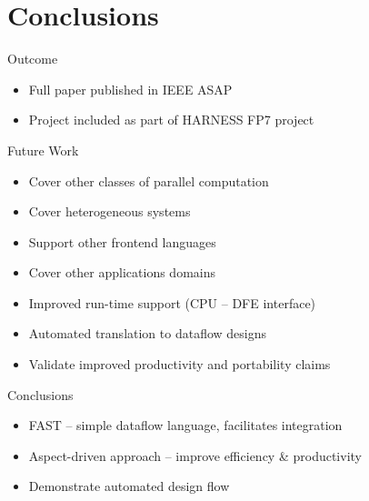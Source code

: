\section{Conclusions}
\begin{frame}{Outcome}
\begin{itemize}
  \item Full paper published in IEEE ASAP
  \item Project included as part of HARNESS FP7 project
\end{itemize}
\end{frame}

\begin{frame}{Future Work}

\begin{itemize}
\item Cover other classes of parallel computation

\item Cover heterogeneous systems

\item Support other frontend languages

\item Cover other applications domains

\item Improved run-time support (CPU -- DFE interface)

\item Automated translation to dataflow designs

\item Validate improved productivity and
    portability claims

\end{itemize}
\end{frame}

\begin{frame}{Conclusions}
\begin{itemize}
  \item FAST -- simple dataflow language, facilitates integration
  \item Aspect-driven approach -- improve efficiency \& productivity
  \item Demonstrate automated design flow
\end{itemize}
\end{frame}
